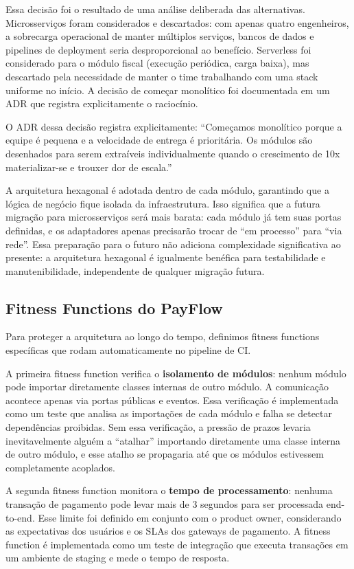 Essa decisão foi o resultado de uma análise deliberada das alternativas.
Microsserviços foram considerados e descartados: com apenas quatro engenheiros,
a sobrecarga operacional de manter múltiplos serviços, bancos de dados e
pipelines de deployment seria desproporcional ao benefício. Serverless foi
considerado para o módulo fiscal (execução periódica, carga baixa), mas
descartado pela necessidade de manter o time trabalhando com uma stack
uniforme no início. A decisão de começar monolítico foi documentada em um
ADR que registra explicitamente o raciocínio.

O ADR dessa decisão registra explicitamente: ``Começamos monolítico porque a
equipe é pequena e a velocidade de entrega é prioritária. Os módulos são
desenhados para serem extraíveis individualmente quando o crescimento de 10x
materializar-se e trouxer dor de escala.''

A arquitetura hexagonal é adotada dentro de cada módulo, garantindo que a lógica
de negócio fique isolada da infraestrutura. Isso significa que a futura migração
para microsserviços será mais barata: cada módulo já tem suas portas definidas,
e os adaptadores apenas precisarão trocar de ``em processo'' para ``via rede''.
Essa preparação para o futuro não adiciona complexidade significativa ao presente:
a arquitetura hexagonal é igualmente benéfica para testabilidade e
manutenibilidade, independente de qualquer migração futura.

\subsection{Fitness Functions do PayFlow}

Para proteger a arquitetura ao longo do tempo, definimos fitness functions
específicas que rodam automaticamente no pipeline de CI.

A primeira fitness function verifica o \textbf{isolamento de módulos}: nenhum
módulo pode importar diretamente classes internas de outro módulo. A comunicação
acontece apenas via portas públicas e eventos. Essa verificação é implementada
como um teste que analisa as importações de cada módulo e falha se detectar
dependências proibidas. Sem essa verificação, a pressão de prazos levaria
inevitavelmente alguém a ``atalhar'' importando diretamente uma classe interna
de outro módulo, e esse atalho se propagaria até que os módulos estivessem
completamente acoplados.

A segunda fitness function monitora o \textbf{tempo de processamento}: nenhuma
transação de pagamento pode levar mais de 3 segundos para ser processada
end-to-end. Esse limite foi definido em conjunto com o product owner, considerando
as expectativas dos usuários e os SLAs dos gateways de pagamento. A fitness
function é implementada como um teste de integração que executa transações em
um ambiente de staging e mede o tempo de resposta.

